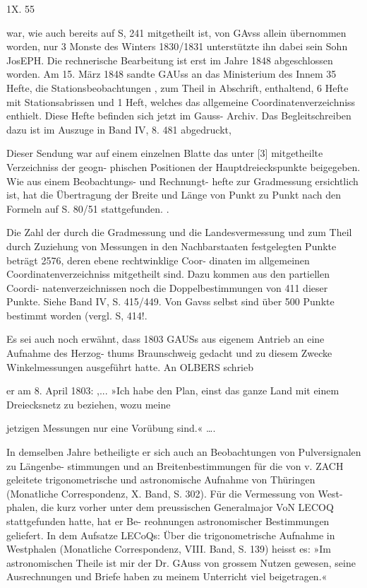 \documentclass[12pt,a4paper]{article}
\theoremstyle{plain}
\theoremstyle{definition}
\theoremstyle{remark}
\begin{document}
\noindent
1X. 55

\noindent

\noindent
war, wie auch bereits auf S, 241 mitgetheilt ist, von GAvss allein übernommen worden, nur 3 Monste
des Winters 1830/1831 unterstützte ihn dabei sein Sohn JosEPH. Die rechnerische Bearbeitung ist erst im
Jahre 1848 abgeschlossen worden. Am 15. März 1848 sandte GAUss an das Ministerium des Innem
35 Hefte, die Stationsbeobachtungen , zum Theil in Abschrift, enthaltend, 6 Hefte mit Stationsabrissen und
1 Heft, welches das allgemeine Coordinatenverzeichniss enthielt. Diese Hefte befinden sich jetzt im Gauss-
Archiv. Das Begleitschreiben dazu ist im Auszuge in Band IV, 8. 481 abgedruckt,

\noindent
Dieser Sendung war auf einem einzelnen Blatte das unter [3] mitgetheilte Verzeichniss der geogn-
phischen Positionen der Hauptdreieckspunkte beigegeben. Wie aus einem Beobachtungs- und Rechnungt-
hefte zur Gradmessung ersichtlich ist, hat die Übertragung der Breite und Länge von Punkt zu Punkt nach
den Formeln auf S. 80/51 stattgefunden. .

\noindent
Die Zahl der durch die Gradmessung und die Landesvermessung und zum Theil durch Zuziehung
von Messungen in den Nachbarstaaten festgelegten Punkte beträgt 2576, deren ebene rechtwinklige Coor-
dinaten im allgemeinen Coordinatenverzeichniss mitgetheilt sind. Dazu kommen aus den partiellen Coordi-
natenverzeichnissen noch die Doppelbestimmungen von 411 dieser Punkte. Siehe Band IV, S. 415/449. Von
Gavss selbst sind über 500 Punkte bestimmt worden (vergl. S, 414!.

\noindent
Es sei auch noch erwähnt, dass 1803 GAUSs aus eigenem Antrieb an eine Aufnahme des Herzog-
thums Braunschweig gedacht und zu diesem Zwecke Winkelmessungen ausgeführt hatte. An OLBERS schrieb

\noindent
er am 8. April 1803:
,... »Ich habe den Plan, einst das ganze Land mit einem Dreiecksnetz zu beziehen, wozu meine

\noindent
jetzigen Messungen nur eine Vorübung sind.« \ldots.

\noindent
In demselben Jahre betheiligte er sich auch an Beobachtungen von Pulversignalen zu Längenbe-
stimmungen und an Breitenbestimmungen für die von v. ZACH geleitete trigonometrische und astronomische
Aufnahme von Thüringen (Monatliche Correspondenz, X. Band, S. 302). Für die Vermessung von West-
phalen, die kurz vorher unter dem preussischen Generalmajor VoN LECOQ stattgefunden hatte, hat er Be-
reohnungen astronomischer Bestimmungen geliefert. In dem Aufsatze LECoQs: Über die trigonometrische
Aufnahme in Westphalen (Monatliche Correspondenz, VIII. Band, S. 139) heisst es: »Im astronomischen
Theile ist mir der Dr. GAuss von grossem Nutzen gewesen, seine Ausrechnungen und Briefe haben zu
meinem Unterricht viel beigetragen.«
\end{document}
